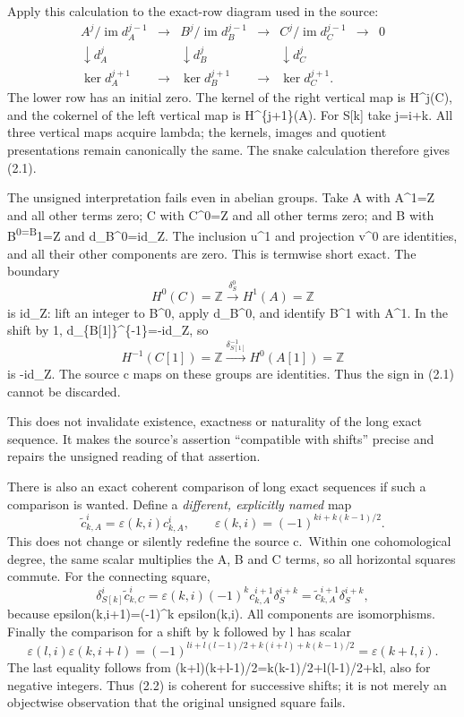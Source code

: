 \documentclass[11pt]{article}
\begin{document}
Apply this calculation to the exact-row diagram used in the source: \[
\begin{array}{ccccccc}
A^j/\operatorname{im}d_A^{j-1}&\longrightarrow&
B^j/\operatorname{im}d_B^{j-1}&\longrightarrow&
C^j/\operatorname{im}d_C^{j-1}&\longrightarrow&0\\
\downarrow d_A^j&&\downarrow d_B^j&&\downarrow d_C^j\\
\ker d_A^{j+1}&\longrightarrow&
\ker d_B^{j+1}&\longrightarrow&\ker d_C^{j+1}.
\end{array}
\] The lower row has an initial zero. The kernel of the right vertical map is H\^{}j(C), and the cokernel of the left vertical map is H\^{}\{j+1\}(A). For S{[}k{]} take j=i+k. All three vertical maps acquire lambda; the kernels, images and quotient presentations remain canonically the same. The snake calculation therefore gives (2.1).

The unsigned interpretation fails even in abelian groups. Take A with A\^{}1=Z and all other terms zero; C with C\^{}0=Z and all other terms zero; and B with B\textsuperscript{0=B}1=Z and d\_B\^{}0=id\_Z. The inclusion u\^{}1 and projection v\^{}0 are identities, and all their other components are zero. This is termwise short exact. The boundary \[
H^0(C)=\mathbb Z\xrightarrow{\delta_S^0}H^1(A)=\mathbb Z
\] is id\_Z: lift an integer to B\^{}0, apply d\_B\^{}0, and identify B\^{}1 with A\^{}1. In the shift by 1, d\_\{B{[}1{]}\}\^{}\{-1\}=-id\_Z, so \[
H^{-1}(C[1])=\mathbb Z
\xrightarrow{\delta_{S[1]}^{-1}}
H^0(A[1])=\mathbb Z
\] is -id\_Z. The source c maps on these groups are identities. Thus the sign in (2.1) cannot be discarded.

This does not invalidate existence, exactness or naturality of the long exact sequence. It makes the source's assertion ``compatible with shifts'' precise and repairs the unsigned reading of that assertion.

There is also an exact coherent comparison of long exact sequences if such a comparison is wanted. Define a \emph{different, explicitly named} map \[
\widetilde c_{k,A}^i
=\varepsilon(k,i)c_{k,A}^i,\qquad
\varepsilon(k,i)=(-1)^{ki+k(k-1)/2}.                         \tag{2.2}
\] This does not change or silently redefine the source c.~Within one cohomological degree, the same scalar multiplies the A, B and C terms, so all horizontal squares commute. For the connecting square, \[
\delta_{S[k]}^i\widetilde c_{k,C}^i
=\varepsilon(k,i)(-1)^k c_{k,A}^{i+1}\delta_S^{i+k}
=\widetilde c_{k,A}^{i+1}\delta_S^{i+k},
\] because epsilon(k,i+1)=(-1)\^{}k epsilon(k,i). All components are isomorphisms. Finally the comparison for a shift by k followed by l has scalar \[
\varepsilon(l,i)\varepsilon(k,i+l)
=(-1)^{li+l(l-1)/2+k(i+l)+k(k-1)/2}
=\varepsilon(k+l,i).
\] The last equality follows from (k+l)(k+l-1)/2=k(k-1)/2+l(l-1)/2+kl, also for negative integers. Thus (2.2) is coherent for successive shifts; it is not merely an objectwise observation that the original unsigned square fails.
\end{document}
